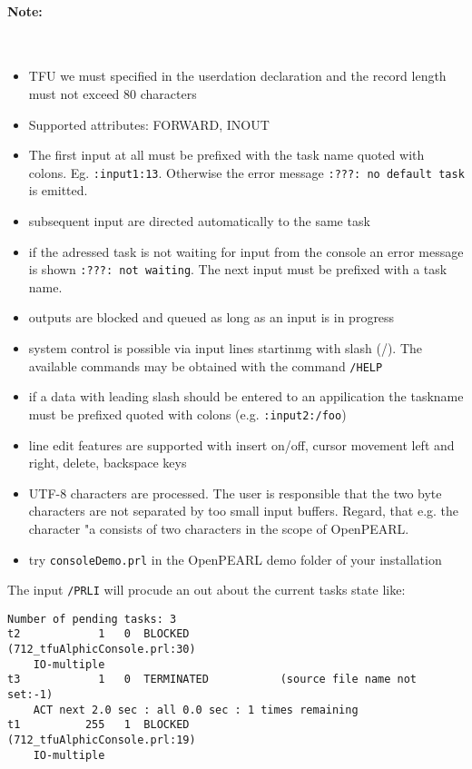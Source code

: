 \paragraph{Note:}\ 
\begin{itemize}
\item  TFU we must specified in the userdation declaration
and the record length must not exceed 80 characters
\item Supported attributes: FORWARD, INOUT
\item The first input at all must be prefixed with the task name
 quoted with colons. Eg. \verb|:input1:13|. Otherwise the error message
 \verb|:???: no default task| is emitted.
\item subsequent input are directed automatically to the same task
\item if the adressed task is not waiting for input from the console an
  error message is shown \verb|:???: not waiting|. The next input must be 
  prefixed with a task name.
\item outputs are blocked and queued as long as an input is in progress
\item system control is possible via input lines startinmg with slash (/).
  The available commands may be obtained with the command \verb|/HELP|
\item if a data with leading slash should  be entered to an appilication
   the taskname must be prefixed quoted with colons (e.g. \verb|:input2:/foo|)
\item line edit features are supported with 
   insert on/off, cursor movement left and right, delete, backspace keys
\item UTF-8 characters are processed. The user is responsible that 
   the two byte characters are not separated by too small input buffers.
   Regard, that e.g. the character "a consists of  two characters in the 
   scope of OpenPEARL.
\item try \verb|consoleDemo.prl|  in the OpenPEARL demo folder of your installation
\end{itemize}
The input \texttt{/PRLI} will procude an out about the current 
tasks state like:
\begin{verbatim}
Number of pending tasks: 3
t2            1   0  BLOCKED              (712_tfuAlphicConsole.prl:30)
	IO-multiple
t3            1   0  TERMINATED           (source file name not set:-1)
	ACT next 2.0 sec : all 0.0 sec : 1 times remaining
t1          255   1  BLOCKED              (712_tfuAlphicConsole.prl:19)
	IO-multiple
\end{verbatim}

